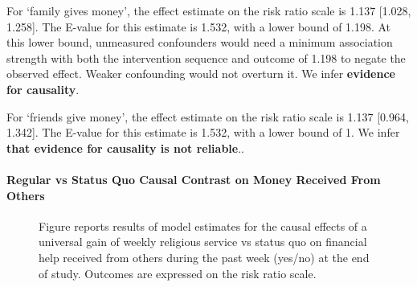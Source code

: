 \documentclass[
  single column]{article}
\let\oldparagraph\paragraph
\renewcommand{\paragraph}[1]{\oldparagraph{#1}\mbox{}}
\begin{document}
For `family gives money', the effect estimate on the risk ratio scale is
1.137 {[}1.028, 1.258{]}. The E-value for this estimate is 1.532, with a
lower bound of 1.198. At this lower bound, unmeasured confounders would
need a minimum association strength with both the intervention sequence
and outcome of 1.198 to negate the observed effect. Weaker confounding
would not overturn it. We infer \textbf{evidence for causality}.

For `friends give money', the effect estimate on the risk ratio scale is
1.137 {[}0.964, 1.342{]}. The E-value for this estimate is 1.532, with a
lower bound of 1. We infer \textbf{that evidence for causality is not
reliable}..

\newpage{}

\paragraph{Regular vs Status Quo Causal Contrast on Money Received From
Others}\label{regular-vs-status-quo-causal-contrast-on-money-received-from-others}

\begin{figure}


\caption{\label{fig-3_2}Figure reports results of model estimates for
the causal effects of a universal gain of weekly religious service vs
status quo on financial help received from others during the past week
(yes/no) at the end of study. Outcomes are expressed on the risk ratio
scale.}

\end{figure}%
\end{document}
